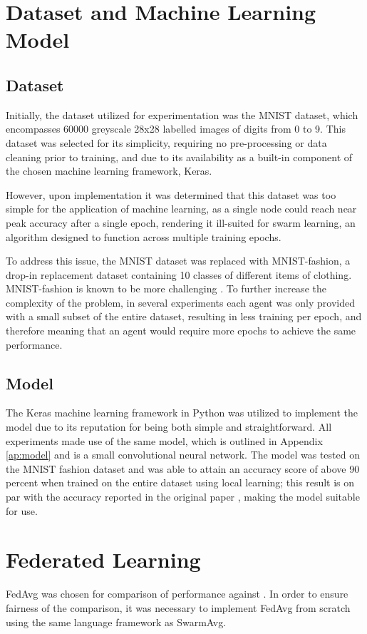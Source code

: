 \section{Dataset and Machine Learning Model}
\subsection{Dataset}
Initially, the dataset utilized for experimentation was the MNIST dataset, which encompasses 60000 greyscale 28x28 labelled images of digits from 0 to 9. This dataset was selected for its simplicity, requiring no pre-processing or data cleaning prior to training, and due to its availability as a built-in component of the chosen machine learning framework, Keras.

However, upon implementation it was determined that this dataset was too simple for the application of machine learning, as a single node could reach near peak accuracy after a single epoch, rendering it ill-suited for swarm learning, an algorithm designed to function across multiple training epochs.

To address this issue, the MNIST dataset was replaced with MNIST-fashion, a drop-in replacement dataset containing 10 classes of different items of clothing. MNIST-fashion is known to be more challenging \cite{xiao2017fashionmnist}. To further increase the complexity of the problem, in several experiments each agent was only provided with a small subset of the entire dataset, resulting in less training per epoch, and therefore meaning that an agent would require more epochs to achieve the same performance.

\subsection{Model}
The Keras machine learning framework in Python was utilized to implement the model due to its reputation for being both simple and straightforward. All experiments made use of the same model, which is outlined in Appendix \ref{ap:model} and is a small convolutional neural network. The model was tested on the MNIST fashion dataset and was able to attain an accuracy score of above 90 percent when trained on the entire dataset using local learning; this result is on par with the accuracy reported in the original paper \cite{xiao2017fashionmnist}, making the model suitable for use.


\section{Federated Learning}
FedAvg was chosen for comparison of performance against \SL. In order to ensure fairness of the comparison, it was necessary to implement FedAvg from scratch using the same language framework as SwarmAvg.
